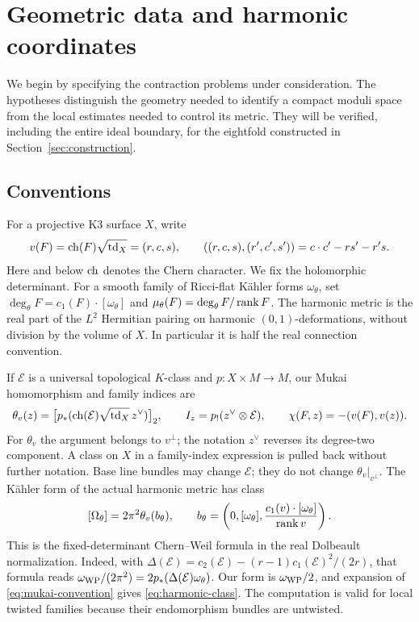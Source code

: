 \section{Geometric data and harmonic coordinates}\label{sec:data}

We begin by specifying the contraction problems under consideration.
The hypotheses distinguish the geometry needed to identify a compact
moduli space from the local estimates needed to control its metric.
They will be verified, including the entire ideal boundary, for the
eightfold constructed in Section~\ref{sec:construction}.

\subsection{Conventions}
For a projective K3 surface \(X\), write
\[
 v(F)=\operatorname{ch}(F)\sqrt{\operatorname{td}_X}=(r,c,s),\qquad
 ((r,c,s),(r',c',s'))=c\cdot c'-rs'-r's .
\]
Here and below \(\operatorname{ch}\) denotes the Chern character. We fix the
holomorphic determinant. For a smooth family of Ricci-flat Kähler forms
\(\omega_\theta\), set
\(\deg_\theta F=c_1(F)\cdot[\omega_\theta]\) and
\(\mu_\theta(F)=\deg_\theta F/\operatorname{rank} F\).
The harmonic metric is the real part of the \(L^2\) Hermitian pairing
on harmonic \((0,1)\)-deformations, without division by the volume of
\(X\). In particular it is half the real connection convention.

If \(\mathcal E\) is a universal topological \(K\)-class and
\(p:X\times M\to M\), our Mukai homomorphism and family indices are
\begin{equation}\label{eq:mukai-convention}
 \theta_v(z)=\bigl[p_*(\operatorname{ch}(\mathcal E)\sqrt{\operatorname{td}_X}\,z^\vee)\bigr]_2,
 \qquad
 I_z=p_!(z^\vee\otimes\mathcal E),\qquad
 \chi(F,z)=-(v(F),v(z)).
\end{equation}
For \(\theta_v\) the argument belongs to \(v^\perp\); the notation
\(z^\vee\) reverses its degree-two component. A class on \(X\) in a
family-index expression is pulled back without further notation.
Base line bundles may change \(\mathcal E\); they do not change
\(\theta_v|_{v^\perp}\).
The Kähler form of the actual harmonic metric has class
\begin{equation}\label{eq:harmonic-class}
 [\Omega_\theta]=2\pi^2\theta_v(b_\theta),\qquad
 b_\theta=\left(0,[\omega_\theta],
       \frac{c_1(v)\cdot[\omega_\theta]}{\operatorname{rank} v}\right).
\end{equation}
This is the fixed-determinant Chern--Weil formula
\cite[Proposition~4.3, (4.6)]{biswasschumacher} in the real Dolbeault
normalization. Indeed, with
\(\Delta(\mathcal E)=c_2(\mathcal E)-(r-1)c_1(\mathcal E)^2/(2r)\),
that formula reads
\(\omega_{\rm WP}/(2\pi^2)=2p_*(\Delta(\mathcal E)\omega_\theta)\).
Our form is \(\omega_{\rm WP}/2\), and expansion of
\eqref{eq:mukai-convention} gives \eqref{eq:harmonic-class}.
The computation is valid for local twisted families because their
endomorphism bundles are untwisted.

